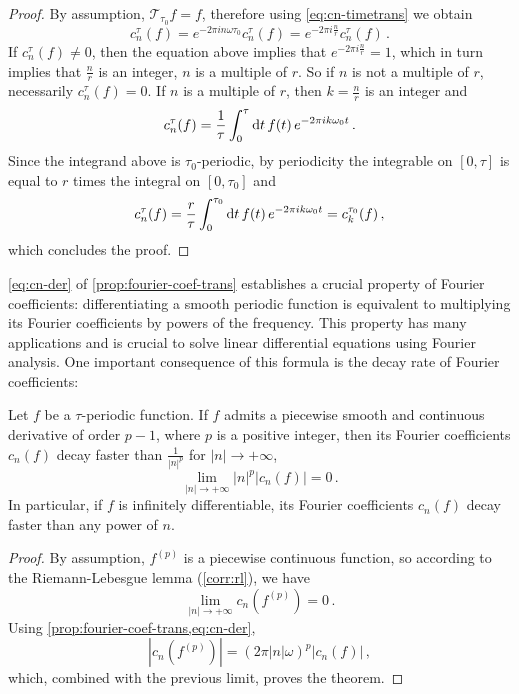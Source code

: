 \begin{proof}
  By assumption, $\mathcal{T}_{\tau_0}f=f$, therefore using \cref{eq:cn-timetrans} we
  obtain
  \begin{equation}
    c_n^\tau(f)=e^{-2\pi i n\omega \tau_0}c_n^\tau(f)=e^{-2\pi i \frac{n}{r}}c_n^\tau(f)\,.
  \end{equation}
  If $c_n^\tau(f)\neq 0$, then the equation above implies that $e^{-2\pi i
  \frac{n}{r}}=1$, which in turn implies that $\frac{n}{r}$ is an integer, \ie $n$ is a
  multiple of $r$. So if $n$ is not a multiple of $r$, necessarily $c_n^\tau(f)=0$. If $n$
  is a multiple of $r$, then $k=\frac{n}{r}$ is an integer and
  \begin{equation}
    c_n^\tau(f)=\frac{1}{\tau}\int_{0}^{\tau}\mathrm{d} t\,f(t)\,e^{-2\pi i k\omega_0 t}\,.
  \end{equation}
  Since the integrand above is $\tau_0$-periodic, by periodicity the integrable on
  $[0,\tau]$ is equal to $r$ times the integral on $[0,\tau_0]$ and
  \begin{equation}
    c_n^\tau(f)=\frac{r}{\tau}\int_{0}^{\tau_0}\mathrm{d} t\,f(t)\,
    e^{-2\pi i k\omega_0 t}=c_{k}^{\tau_0}(f)\,,
  \end{equation}
  which concludes the proof.
\end{proof}
\cref{eq:cn-der} of \cref{prop:fourier-coef-trans} establishes a crucial property of
Fourier coefficients: differentiating a smooth periodic function is equivalent to
multiplying its Fourier coefficients by powers of the frequency. This property has many
applications and is crucial to solve linear differential equations using Fourier analysis.
One important consequence of this formula is the decay rate of Fourier coefficients:
\begin{theorem}
  \label{thm:fourier-series-decay}
  Let $f$ be a $\tau$-periodic function. If $f$ admits a piecewise smooth and continuous
  derivative of order $p-1$, where $p$ is a positive integer, then its Fourier
  coefficients $c_n(f)$ decay faster than $\frac{1}{|n|^p}$ for $|n|\to+\infty$, \ie
  \begin{equation}
    \lim_{|n|\to+\infty} |n|^p|c_n(f)|=0\,.
  \end{equation}
  In particular, if $f$ is infinitely differentiable, its Fourier coefficients $c_n(f)$
  decay faster than any power of $n$.
\end{theorem}
\begin{proof}
  By assumption, $f^{(p)}$ is a piecewise continuous function, so according to the
  Riemann-Lebesgue lemma (\cref{corr:rl}), we have
  \begin{equation}
    \lim_{|n|\to+\infty} c_n(f^{(p)})=0\,.
  \end{equation}
  Using \cref{prop:fourier-coef-trans,eq:cn-der},
  \begin{equation}
    |c_n(f^{(p)})|=(2\pi |n|\omega)^p|c_n(f)|\,,
  \end{equation}
  which, combined with the previous limit, proves the theorem.
\end{proof}
